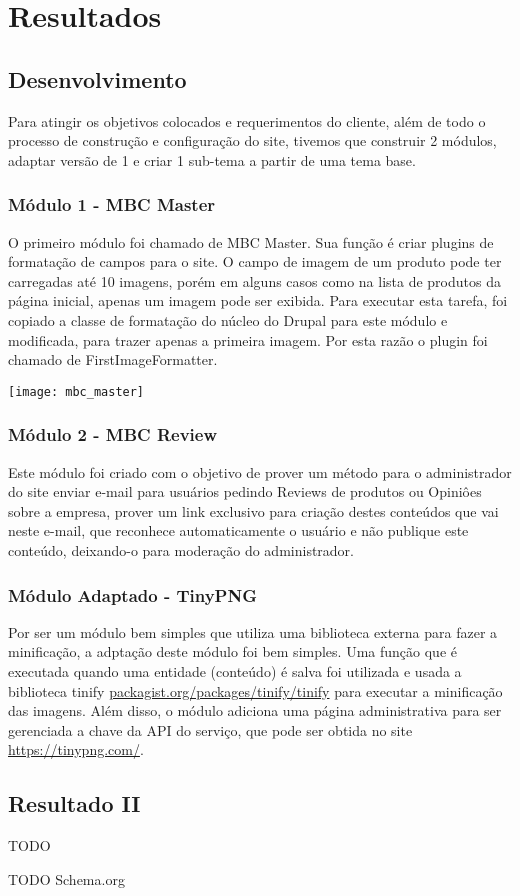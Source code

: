 \chapter{Resultados}

\graphicspath{ {/var/www/html/meninadasbalas/projetc/monografia/latex/images/} }

\section{Desenvolvimento}
Para atingir os objetivos colocados e requerimentos do cliente, além de todo o processo de construção e configuração do site, tivemos que construir 2 módulos, adaptar versão de 1 e criar 1 sub-tema a partir de uma tema base.

\subsection{Módulo 1 - MBC Master}
O primeiro módulo foi chamado de MBC Master. Sua função é criar plugins de formatação de campos para o site. O campo de imagem de um produto pode ter carregadas até 10 imagens, porém em alguns casos como na lista de produtos da página inicial, apenas um imagem pode ser exibida. Para executar esta tarefa, foi copiado a classe de formatação do núcleo do Drupal para este módulo e modificada, para trazer apenas a primeira imagem. Por esta razão o plugin foi chamado de FirstImageFormatter.

\texttt{[image: mbc\_master]}

\subsection{Módulo 2 - MBC Review}
Este módulo foi criado com o objetivo de prover um método para o administrador do site enviar e-mail para usuários pedindo Reviews de produtos ou Opiniôes sobre a empresa, prover um link exclusivo para criação destes conteúdos que vai neste e-mail, que reconhece automaticamente o usuário e não publique este conteúdo, deixando-o para moderação do administrador.

\subsection{Módulo Adaptado - TinyPNG}
Por ser um módulo bem simples que utiliza uma biblioteca externa para fazer a minificação, a adptação deste módulo foi bem simples. Uma função que é executada quando uma entidade (conteúdo) é salva foi utilizada e usada a biblioteca tinify \url{packagist.org/packages/tinify/tinify} para executar a minificação das imagens. Além disso, o módulo adiciona uma página administrativa para ser gerenciada a chave da API do serviço, que pode ser obtida no site \url{https://tinypng.com/}.

\section{Resultado II}

TODO

TODO Schema.org
